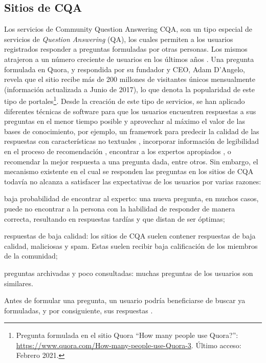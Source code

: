 \subsection{Sitios de CQA}
Los servicios de Community Question Answering CQA, son un tipo especial de servicios de \textit{Question Answering} (QA), los cuales permiten a los usuarios registrados responder a preguntas formuladas por otras personas. Los mismos atrajeron a un número creciente de usuarios en los últimos años \citep{li2010routing}. Una pregunta formulada en Quora, y respondida por su fundador y CEO, Adam D'Angelo, revela que el sitio recibe más de 200 millones de visitantes únicos mensualmente (información actualizada a Junio de 2017), lo que denota la popularidad de este tipo de portales\footnote{Pregunta formulada en el sitio Quora “How many people use Quora?”: \url{https://www.quora.com/How-many-people-use-Quora-3}. Último acceso: Febrero 2021.}. Desde la creación de este tipo de servicios, se han aplicado diferentes técnicas de software para que los usuarios encuentren respuestas a sus preguntas en el menor tiempo posible y aprovechar al máximo el valor de las bases de conocimiento, por ejemplo, un framework para predecir la calidad de las respuestas con características no textuales \citep{jeon2006framework}, incorporar información de legibilidad en el proceso de recomendación \citep{anuyah2017can}, encontrar a los expertos apropiados \citep{li2010routing}, o recomendar la mejor respuesta a una pregunta dada, entre otros. Sin embargo, el mecanismo existente en el cual se responden las preguntas en los sitios de CQA todavía no alcanza a satisfacer las expectativas de los usuarios por varias razones: \begin{enumerate*} [label=(\roman*)] \item baja probabilidad de encontrar al experto: una nueva pregunta, en muchos casos, puede no encontrar a la persona con la habilidad de responder de manera correcta, resultando en respuestas tardías y que distan de ser óptimas; \item respuestas de baja calidad: los sitios de CQA suelen contener respuestas de baja calidad, maliciosas y spam. Estas suelen recibir baja calificación de los miembros de la comunidad; \item preguntas archivadas y poco consultadas: muchas preguntas de los usuarios son similares.\end{enumerate*} Antes de formular una pregunta, un usuario podría beneficiarse de buscar ya formuladas, y por consiguiente, sus respuestas \citep{yang2013cqarank}.
